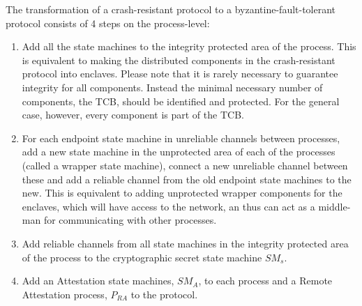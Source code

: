\documentclass{article}
\begin{document}
	The transformation of a crash-resistant protocol to a byzantine-fault-tolerant protocol consists of 4 steps on the process-level:
	\begin{enumerate}
		\item Add all the state machines to the integrity protected area of the process.
		This is equivalent to making the distributed components in the crash-resistant protocol into enclaves.
		Please note that it is rarely necessary to guarantee integrity for all components.
		Instead the minimal necessary number of components, the TCB, should be identified and protected.
		For the general case, however, every component is part of the TCB.
		\item For each endpoint state machine in unreliable channels between processes, add a new state machine in the unprotected area of each of the processes (called a wrapper state machine), connect a new unreliable channel between these and add a reliable channel from the old endpoint state machines to the new. This is equivalent to adding unprotected wrapper components for the enclaves, which will have access to the network, an thus can act as a middle-man for communicating with other processes.
		\item Add reliable channels from all state machines in the integrity protected area of the process to the cryptographic secret state machine $SM_s$.
		\item Add an Attestation state machines, $SM_A$, to each process and a Remote Attestation process, $P_{RA}$ to the protocol.
	\end{enumerate}
\end{document}
